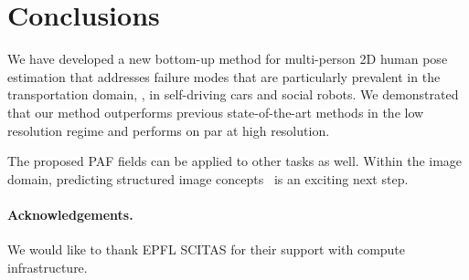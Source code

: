 \documentclass[10pt,twocolumn,letterpaper]{article}
\begin{document}
\section{Conclusions}

We have developed a new bottom-up method for multi-person 2D human pose estimation
that addresses failure modes that are particularly prevalent
in the transportation domain, \ie, in self-driving cars and social
robots. We demonstrated that our method outperforms previous state-of-the-art methods
in the low resolution regime and performs on par at high resolution.




The proposed PAF fields can be applied to other tasks as well. Within the image domain,
predicting structured image concepts~\cite{krishnavisualgenome} is an exciting next step.

\paragraph{Acknowledgements.}
We would like to thank EPFL SCITAS for their support with compute infrastructure.



\clearpage

{\small


}
\end{document}
